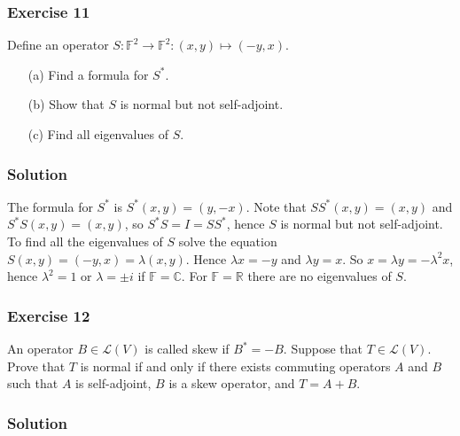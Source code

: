 \subsubsection*{Exercise 11}

Define an operator $S: \mathbb{F}^2 \to \mathbb{F}^2: (x, y) \mapsto (-y, x)$.
\begin{itemize}
\item[(a)] Find a formula for $S^*$.
\item[(b)] Show that $S$ is normal but not self-adjoint.
\item[(c)] Find all eigenvalues of $S$.
\end{itemize}

\subsubsection*{Solution}
The formula for $S^*$ is $S^*(x, y) = (y, -x)$.
Note that $SS^*(x, y) = (x, y)$ and $S^*S(x, y) = (x, y)$, so $S^*S = I = SS^*$, hence $S$ is normal but not self-adjoint.
To find all the eigenvalues of $S$ solve the equation $S(x, y) = (-y, x) = \lambda(x, y)$.
Hence $\lambda x = -y$ and $\lambda y = x$.
So $x = \lambda y = -\lambda^2 x$, hence $\lambda^2 = 1$ or $\lambda = \pm i$ if $\mathbb{F} = \mathbb{C}$.
For $\mathbb{F} = \mathbb{R}$ there are no eigenvalues of $S$.


\subsubsection*{Exercise 12}

An operator $B \in \mathcal{L}(V)$ is called skew if $B^* = -B$.
Suppose that $T \in \mathcal{L}(V)$.
Prove that $T$ is normal if and only if there exists commuting operators $A$ and $B$ such that $A$ is self-adjoint, $B$ is a skew operator, and $T = A + B$.

\subsubsection*{Solution}

